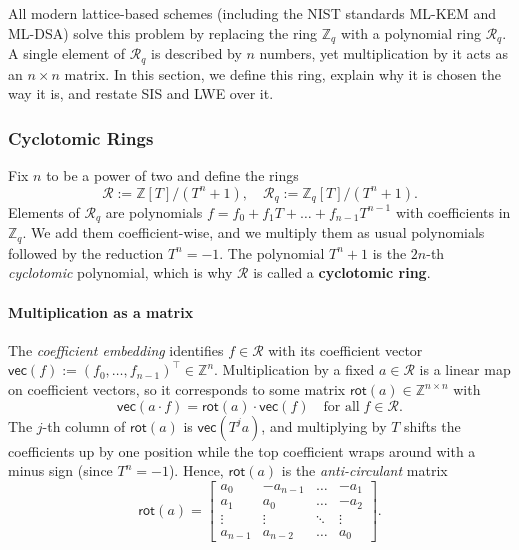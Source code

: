 \documentclass[../../book.tex]{subfiles}
\begin{document}
All modern lattice-based schemes (including the NIST standards ML-KEM and ML-DSA) solve this problem by replacing the ring $\mathbb{Z}_q$ with a polynomial ring $\mathcal{R}_q$.
A single element of $\mathcal{R}_q$ is described by $n$ numbers, yet multiplication by it acts as an $n \times n$ matrix.
In this section, we define this ring, explain why it is chosen the way it is, and restate SIS and LWE over it.

\subsubsection{Cyclotomic Rings}\label{subsec:cyclotomic-rings}

Fix $n$ to be a power of two and define the rings
\begin{equation*}
    \mathcal{R} := \mathbb{Z}[T]/(T^n+1), \quad \mathcal{R}_q := \mathbb{Z}_q[T]/(T^n+1).
\end{equation*}
Elements of $\mathcal{R}_q$ are polynomials $f = f_0 + f_1T + \dots + f_{n-1}T^{n-1}$ with coefficients in $\mathbb{Z}_q$.
We add them coefficient-wise, and we multiply them as usual polynomials followed by the reduction $T^n = -1$.
The polynomial $T^n+1$ is the $2n$-th \emph{cyclotomic} polynomial, which is why $\mathcal{R}$ is called a \textbf{cyclotomic ring}.

\paragraph{Multiplication as a matrix}
The \emph{coefficient embedding} identifies $f \in \mathcal{R}$ with its coefficient vector $\mathsf{vec}(f) := (f_0,\dots,f_{n-1})^{\top} \in \mathbb{Z}^n$.
Multiplication by a fixed $a \in \mathcal{R}$ is a linear map on coefficient vectors, so it corresponds to some matrix $\mathsf{rot}(a) \in \mathbb{Z}^{n \times n}$ with
\begin{equation*}
    \mathsf{vec}(a \cdot f) = \mathsf{rot}(a) \cdot \mathsf{vec}(f) \quad \text{for all} \; f \in \mathcal{R}.
\end{equation*}
The $j$-th column of $\mathsf{rot}(a)$ is $\mathsf{vec}(T^j a)$, and multiplying by $T$ shifts the coefficients up by one position while the top coefficient wraps around with a minus sign (since $T^n = -1$).
Hence, $\mathsf{rot}(a)$ is the \emph{anti-circulant} matrix
\begin{equation*}
    \mathsf{rot}(a) = \begin{bmatrix}
        a_0 & -a_{n-1} & \dots & -a_1 \\
        a_1 & a_0 & \dots & -a_2 \\
        \vdots & \vdots & \ddots & \vdots \\
        a_{n-1} & a_{n-2} & \dots & a_0
    \end{bmatrix}.
\end{equation*}
\end{document}
